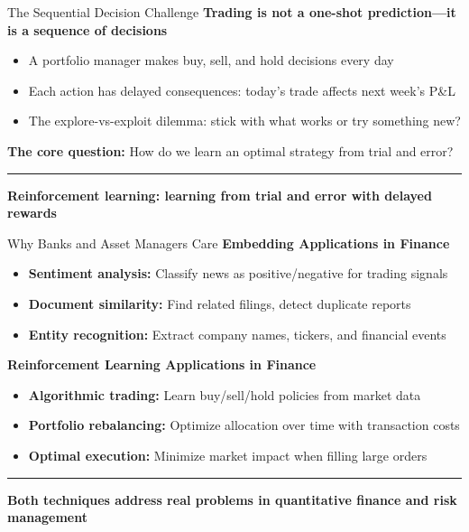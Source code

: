 \documentclass[8pt,aspectratio=169]{beamer}
\newcommand{\bottomnote}[1]{%
\vfill
\vspace{-2mm}
\textcolor{mllavender2}{\rule{\textwidth}{0.4pt}}
\vspace{1mm}
\footnotesize
\textbf{#1}
}
\begin{document}
\begin{frame}[t]{The Sequential Decision Challenge}
\textbf{Trading is not a one-shot prediction---it is a sequence of decisions}
\begin{itemize}
\item A portfolio manager makes buy, sell, and hold decisions every day
\item Each action has delayed consequences: today's trade affects next week's P\&L
\item The explore-vs-exploit dilemma: stick with what works or try something new?
\end{itemize}
\vspace{0.5em}
\textbf{The core question:} How do we learn an optimal strategy from trial and error?
\bottomnote{Reinforcement learning: learning from trial and error with delayed rewards}
\end{frame}

\begin{frame}[t]{Why Banks and Asset Managers Care}
\textbf{Embedding Applications in Finance}
\begin{itemize}
\item \textbf{Sentiment analysis:} Classify news as positive/negative for trading signals
\item \textbf{Document similarity:} Find related filings, detect duplicate reports
\item \textbf{Entity recognition:} Extract company names, tickers, and financial events
\end{itemize}
\vspace{0.5em}
\textbf{Reinforcement Learning Applications in Finance}
\begin{itemize}
\item \textbf{Algorithmic trading:} Learn buy/sell/hold policies from market data
\item \textbf{Portfolio rebalancing:} Optimize allocation over time with transaction costs
\item \textbf{Optimal execution:} Minimize market impact when filling large orders
\end{itemize}
\bottomnote{Both techniques address real problems in quantitative finance and risk management}
\end{frame}
\end{document}
